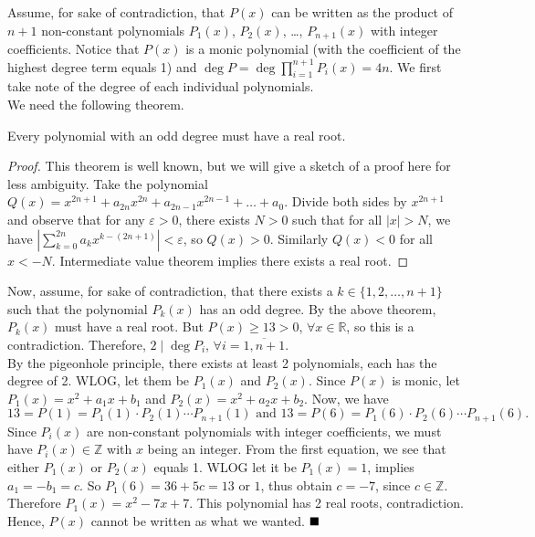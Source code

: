 \documentclass[11pt]{article}
\newcommand{\divides}{\mid}
\newenvironment{solution}[1][Solution]{%
  \proof[\normalfont \faPenNib \hspace{0.2cm} \ttfamily \scshape \large #1]%
}{\(\hfill \blacksquare\){\parfillskip0pt\par}}
\theoremstyle{definition}
\begin{document}
        \begin{solution}
            Assume, for sake of contradiction, that \(P(x)\) can be written as the product of \(n + 1\) non-constant polynomials \(P_1(x)\), \(P_2(x)\), \dots, \(P_{n+1}(x)\) with integer coefficients. Notice that \(P(x)\) is a monic polynomial (with the coefficient of the highest degree term equals 1) and \(\deg P = \deg \prod\limits_{i=1}^{n+1}P_i(x) = 4n\). We first take note of the degree of each individual polynomials.\\
            We need the following theorem.

            \begin{claim}
                Every polynomial with an odd degree must have a real root.
            \end{claim}

            \begin{proof}
                This theorem is well known, but we will give a sketch of a proof here for less ambiguity. Take the polynomial \(Q(x) = x^{2n+1} + a_{2n}x^{2n} + a_{2n-1}x^{2n-1} + \dots + a_0\). Divide both sides by \(x^{2n+1}\) and observe that for any \(\varepsilon > 0\), there exists \(N > 0\) such that for all \(\left|x\right| > N\), we have \(\left|\sum\limits_{k=0}^{2n} a_kx^{k-(2n+1)}\right| < \varepsilon\), so \(Q(x) > 0\). Similarly \(Q(x) < 0\) for all \(x < -N\). Intermediate value theorem implies there exists a real root.
            \end{proof}

            Now, assume, for sake of contradiction, that there exists a \(k \in \{1,2,\dots,n+1\}\) such that the polynomial \(P_k(x)\) has an odd degree. By the above theorem, \(P_k(x)\) must have a real root. But \(P(x) \geq 13 > 0\), \(\forall x \in \mathbb{R}\), so this is a contradiction. Therefore, \(2 \divides \deg P_i\), \(\forall i = \overline{1,n+1}\).\\
            By the pigeonhole principle, there exists at least 2 polynomials, each has the degree of 2. WLOG, let them be \(P_1(x)\) and \(P_2(x)\). Since \(P(x)\) is monic, let \(P_1(x) = x^2 + a_1x + b_1\) and \(P_2(x) = x^2 + a_2x + b_2\). Now, we have
            \[13 = P(1) = P_1(1) \cdot P_2(1) \cdots P_{n+1}(1) \text{ \ and \ } 13 = P(6) = P_1(6) \cdot P_2(6) \cdots P_{n+1}(6).\]
            Since \(P_i(x)\) are non-constant polynomials with integer coefficients, we must have \(P_i(x) \in \mathbb{Z}\) with \(x\) being an integer. From the first equation, we see that either \(P_1(x)\) or \(P_2(x)\) equals 1. WLOG let it be \(P_1(x) = 1\), implies \(a_1 = -b_1 = c\). So \(P_1(6) = 36 + 5c = 13\) or \(1\), thus obtain \(c = -7\), since \(c \in \mathbb{Z}\). Therefore \(P_1(x) = x^2 - 7x + 7\). This polynomial has 2 real roots, contradiction.\\
            Hence, \(P(x)\) cannot be written as what we wanted.
        \end{solution}
\end{document}
